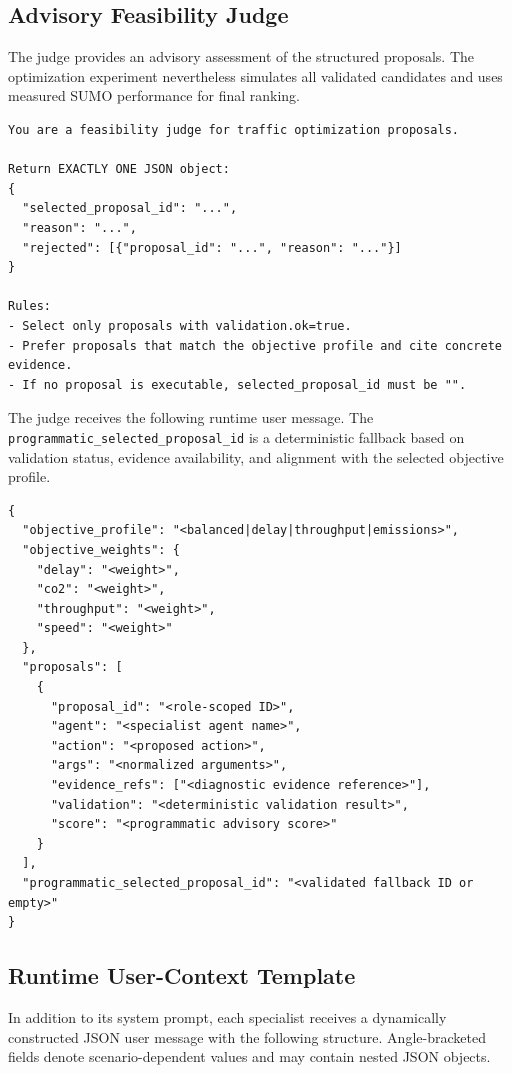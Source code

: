 \subsection{Advisory Feasibility Judge}
\label{app:judge-prompt}

The judge provides an advisory assessment of the structured proposals.  The
optimization experiment nevertheless simulates all validated candidates and
uses measured SUMO performance for final ranking.

\begin{lstlisting}[style=llmprompt]
You are a feasibility judge for traffic optimization proposals.

Return EXACTLY ONE JSON object:
{
  "selected_proposal_id": "...",
  "reason": "...",
  "rejected": [{"proposal_id": "...", "reason": "..."}]
}

Rules:
- Select only proposals with validation.ok=true.
- Prefer proposals that match the objective profile and cite concrete evidence.
- If no proposal is executable, selected_proposal_id must be "".
\end{lstlisting}

The judge receives the following runtime user message.  The
\texttt{programmatic\_selected\_proposal\_id} is a deterministic fallback based
on validation status, evidence availability, and alignment with the selected
objective profile.

\begin{lstlisting}[style=llmprompt]
{
  "objective_profile": "<balanced|delay|throughput|emissions>",
  "objective_weights": {
    "delay": "<weight>",
    "co2": "<weight>",
    "throughput": "<weight>",
    "speed": "<weight>"
  },
  "proposals": [
    {
      "proposal_id": "<role-scoped ID>",
      "agent": "<specialist agent name>",
      "action": "<proposed action>",
      "args": "<normalized arguments>",
      "evidence_refs": ["<diagnostic evidence reference>"],
      "validation": "<deterministic validation result>",
      "score": "<programmatic advisory score>"
    }
  ],
  "programmatic_selected_proposal_id": "<validated fallback ID or empty>"
}
\end{lstlisting}

\subsection{Runtime User-Context Template}
\label{app:runtime-context}

In addition to its system prompt, each specialist receives a dynamically
constructed JSON user message with the following structure.  Angle-bracketed
fields denote scenario-dependent values and may contain nested JSON objects.

